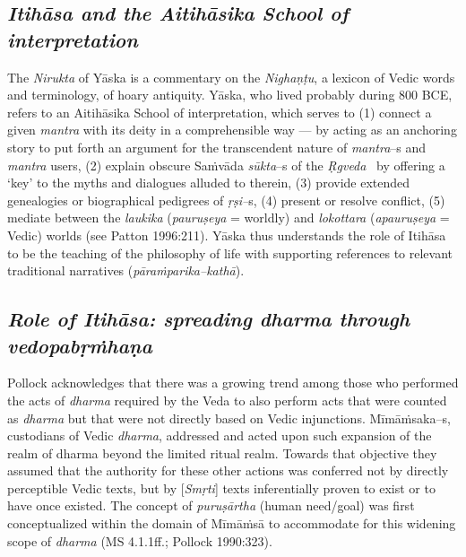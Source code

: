 \subsection*{\textit{Itihāsa and the Aitihāsika School of interpretation}}

The \textit{Nirukta} of Yāska is a commentary on the \textit{Nighaṇṭu}, a lexicon of Vedic words and terminology, of hoary antiquity. Yāska, who lived probably during 800 BCE, refers to an Aitihāsika School of interpretation, which serves to (1) connect a given \textit{mantra} with its deity in a comprehensible way — by acting as an anchoring story to put forth an argument for the transcendent nature of \textit{mantra}–s and \textit{mantra} users, (2) explain obscure Saṁvāda \textit{sūkta}–s of the \textit{Ṛgveda}  by offering a ‘key’ to the myths and dialogues alluded to therein, (3) provide extended genealogies or biographical pedigrees of \textit{ṛṣi–}s, (4) present or resolve conflict, (5) mediate between the \textit{laukika} (\textit{pauruṣeya} = worldly) and \textit{lokottara} (\textit{apauruṣeya} = Vedic) worlds (see Patton 1996:211). Yāska thus understands the role of Itihāsa to be the teaching of the philosophy of life with supporting references to relevant traditional narratives (\textit{pāraṁparika–kathā}).


\subsection*{\textit{Role of Itihāsa: spreading dharma through vedopabṛṁhaṇa}}

Pollock acknowledges that there was a growing trend among those who performed the acts of \textit{dharma} required by the Veda to also perform acts that were counted as \textit{dharma} but that were not directly based on Vedic injunctions. Mīmāṁsaka–s, custodians of Vedic \textit{dharma}, addressed and acted upon such expansion of the realm of dharma beyond the limited ritual realm. Towards that objective they assumed that the authority for these other actions was conferred not by directly perceptible Vedic texts, but by [\textit{Smṛti}] texts inferentially proven to exist or to have once existed. The concept of \textit{puruṣārtha} (human need/goal) was first conceptualized within the domain of Mīmāṁsā to accommodate for this widening scope of \textit{dharma} (MS 4.1.1ff.; Pollock 1990:323).

